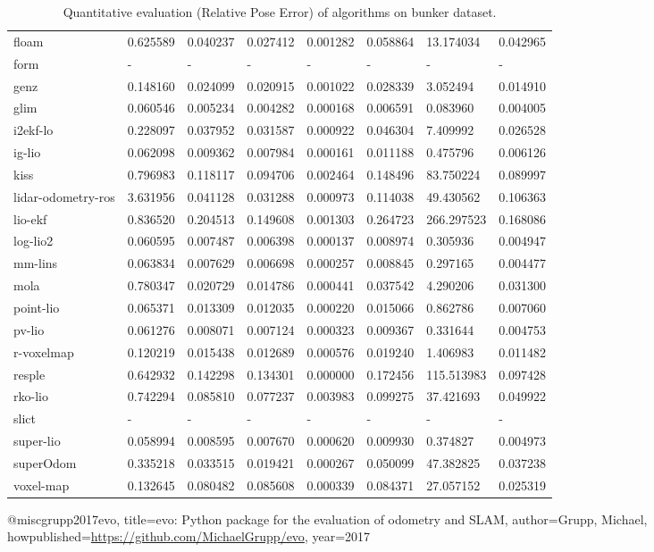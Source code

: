 \begin{table}[]
{\begin{tabular}{llllllll}
		floam & 0.625589 & 0.040237 & 0.027412 & 0.001282 & 0.058864 & 13.174034 & 0.042965 \\
		form & - & - & - & - & - & - & - \\
		genz & 0.148160 & 0.024099 & 0.020915 & 0.001022 & 0.028339 & 3.052494 & 0.014910 \\
		glim & 0.060546 & 0.005234 & 0.004282 & 0.000168 & 0.006591 & 0.083960 & 0.004005 \\
		i2ekf-lo & 0.228097 & 0.037952 & 0.031587 & 0.000922 & 0.046304 & 7.409992 & 0.026528 \\
		ig-lio & 0.062098 & 0.009362 & 0.007984 & 0.000161 & 0.011188 & 0.475796 & 0.006126 \\
		kiss & 0.796983 & 0.118117 & 0.094706 & 0.002464 & 0.148496 & 83.750224 & 0.089997 \\
		lidar-odometry-ros & 3.631956 & 0.041128 & 0.031288 & 0.000973 & 0.114038 & 49.430562 & 0.106363 \\
		lio-ekf & 0.836520 & 0.204513 & 0.149608 & 0.001303 & 0.264723 & 266.297523 & 0.168086 \\
		log-lio2 & 0.060595 & 0.007487 & 0.006398 & 0.000137 & 0.008974 & 0.305936 & 0.004947 \\
		mm-lins & 0.063834 & 0.007629 & 0.006698 & 0.000257 & 0.008845 & 0.297165 & 0.004477 \\
		mola & 0.780347 & 0.020729 & 0.014786 & 0.000441 & 0.037542 & 4.290206 & 0.031300 \\
		point-lio & 0.065371 & 0.013309 & 0.012035 & 0.000220 & 0.015066 & 0.862786 & 0.007060 \\
		pv-lio & 0.061276 & 0.008071 & 0.007124 & 0.000323 & 0.009367 & 0.331644 & 0.004753 \\
		r-voxelmap & 0.120219 & 0.015438 & 0.012689 & 0.000576 & 0.019240 & 1.406983 & 0.011482 \\
		resple & 0.642932 & 0.142298 & 0.134301 & 0.000000 & 0.172456 & 115.513983 & 0.097428 \\
		rko-lio & 0.742294 & 0.085810 & 0.077237 & 0.003983 & 0.099275 & 37.421693 & 0.049922 \\
		slict & - & - & - & - & - & - & - \\
		super-lio & 0.058994 & 0.008595 & 0.007670 & 0.000620 & 0.009930 & 0.374827 & 0.004973 \\
		superOdom & 0.335218 & 0.033515 & 0.019421 & 0.000267 & 0.050099 & 47.382825 & 0.037238 \\
		voxel-map & 0.132645 & 0.080482 & 0.085608 & 0.000339 & 0.084371 & 27.057152 & 0.025319 \\
        	\end{tabular}%
        }
        	\caption{Quantitative evaluation (Relative Pose Error\cite{grupp2017evo}) of algorithms on bunker dataset.}
        	\label{table3}
\end{table}

@misc{grupp2017evo,
  title={evo: Python package for the evaluation of odometry and SLAM},
  author={Grupp, Michael},
  howpublished={\url{https://github.com/MichaelGrupp/evo}},
  year={2017}
}
